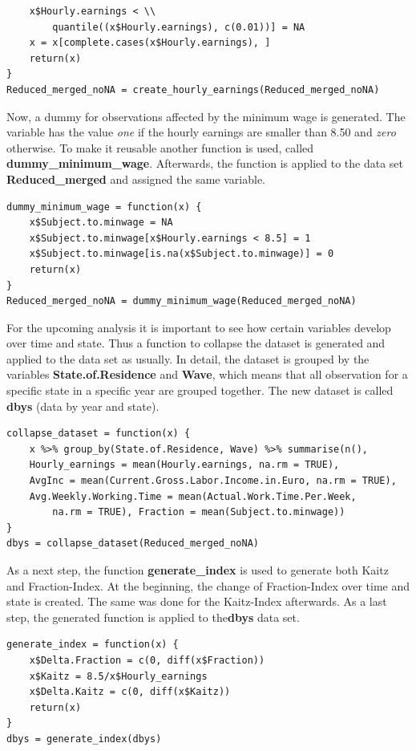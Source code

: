\documentclass[a4paper]{article}
\begin{document}
{\begin{lstlisting}
	x$Hourly.earnings < \\ 
    	quantile((x$Hourly.earnings), c(0.01))] = NA
	x = x[complete.cases(x$Hourly.earnings), ]
    return(x)
}
Reduced_merged_noNA = create_hourly_earnings(Reduced_merged_noNA)
\end{lstlisting}
%
Now, a dummy for observations affected by the minimum wage is generated. The variable has the value \textit{one} if the hourly earnings are smaller than 8.50 and \textit{zero} otherwise. To make it reusable another function is used, called \textbf{dummy\_minimum\_wage}. Afterwards, the function is applied to the data set \textbf{Reduced\_merged} and assigned the same variable.
\begin{lstlisting}
dummy_minimum_wage = function(x) {
    x$Subject.to.minwage = NA
    x$Subject.to.minwage[x$Hourly.earnings < 8.5] = 1
    x$Subject.to.minwage[is.na(x$Subject.to.minwage)] = 0
    return(x)
}
Reduced_merged_noNA = dummy_minimum_wage(Reduced_merged_noNA)
\end{lstlisting}
For the upcoming analysis it is important to see how certain variables develop over time and state. Thus a function to collapse the dataset is generated and applied to the data set as usually. In detail, the dataset is grouped by the variables \textbf{State.of.Residence} and \textbf{Wave}, which means that all observation for a specific state in a specific year are grouped together. The new dataset is called \textbf{dbys} (data by year and state).
\begin{lstlisting}
collapse_dataset = function(x) {
    x %>% group_by(State.of.Residence, Wave) %>% summarise(n(), 
    Hourly_earnings = mean(Hourly.earnings, na.rm = TRUE), 
    AvgInc = mean(Current.Gross.Labor.Income.in.Euro, na.rm = TRUE),
    Avg.Weekly.Working.Time = mean(Actual.Work.Time.Per.Week, 
        na.rm = TRUE), Fraction = mean(Subject.to.minwage))
}
dbys = collapse_dataset(Reduced_merged_noNA)
\end{lstlisting}

As a next step, the function \textbf{generate\_index} is used to generate both Kaitz and Fraction-Index. At the beginning, the change of Fraction-Index over time and state is created. The same was done for the Kaitz-Index afterwards. As a last step, the generated function is applied to the\textbf{dbys} data set. 
\begin{lstlisting}
generate_index = function(x) {
    x$Delta.Fraction = c(0, diff(x$Fraction))
    x$Kaitz = 8.5/x$Hourly_earnings
    x$Delta.Kaitz = c(0, diff(x$Kaitz))
    return(x)
}
dbys = generate_index(dbys)
\end{lstlisting}

}
\end{document}
